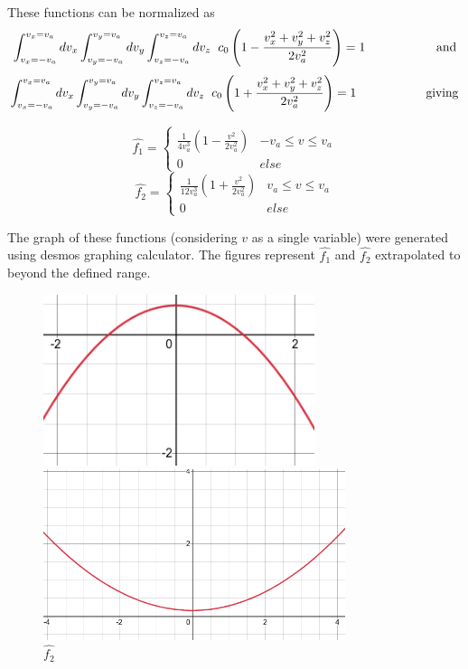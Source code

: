 \documentclass[12pt]{article}
\begin{document}
	These functions can be normalized as
	$$ \int_{v_{x} = -v_{a}}^{v_{x} = v_{a}} dv_{x} \int_{v_{y} = -v_{a}}^{v_{y} = v_{a}} dv_{y} \int_{v_{z} = -v_{a}}^{v_{z} = v_{a}} dv_{z} \hspace{0.2cm}c_{0}  \left(1 - \frac{v_{x}^{2}+v_{y}^{2}+v_{z}^{2}}{2 v_{a}^2}\right) = 1 \hspace{2cm} \mathrm{and}$$
	$$ \int_{v_{x} = -v_{a}}^{v_{x} = v_{a}} dv_{x} \int_{v_{y} = -v_{a}}^{v_{y} = v_{a}} dv_{y} \int_{v_{z} = -v_{a}}^{v_{z} = v_{a}} dv_{z} \hspace{0.2cm} c_{0}  \left(1 + \frac{v_{x}^{2}+v_{y}^{2}+v_{z}^{2}}{2 v_{a}^2}\right) = 1 \hspace{2cm} \mathrm{giving}$$
	
	\[ \hat{f_{1}} = 
	\begin{cases} 
		\frac{1}{4 v_{a}^{3}} \left(1 - \frac{v^{2}}{2 v_{a}^2}\right) & -v_{a}\leq v\leq v_{a} \\
		0 & else 
	\end{cases}
	\]
	\[ \hat{f_{2}} = 
	\begin{cases}
		\frac{1}{12 v_{a}^{3}} \left(1 + \frac{v^{2}}{2 v_{a}^2}\right) & v_{a}\leq v\leq v_{a} \\
		0 & else
	\end{cases}\] 
	
	\noindent The graph of these functions (considering $v$ as a single variable) were generated using desmos graphing calculator. The figures represent $\hat{f_{1}}$ and $\hat{f_{2}}$ extrapolated to beyond the defined range.
	\begin{figure}[H]
		\begin{multicols}{2}
			\includegraphics[width=\linewidth, height=5cm]{first.png} \caption{$\hat{f_{1}}$} \par
			\includegraphics[width=\linewidth, height=5cm]{second.png} \caption{$\hat{f_{2}}$} \par
		\end{multicols}
	\end{figure}
	
\end{document}
